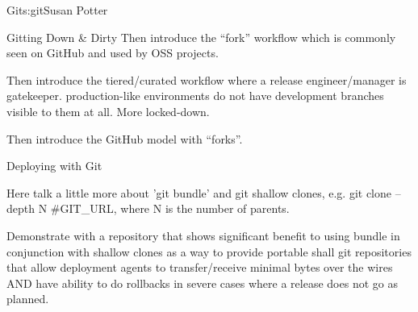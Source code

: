 \begin{aosachapter}{Git}{s:git}{Susan Potter}
\begin{aosasect1}{Gitting Down \& Dirty}
Then introduce the ``fork'' workflow which is commonly seen on GitHub and
used by OSS projects.

Then introduce the tiered/curated workflow where a release engineer/manager
is gatekeeper. production-like environments do not have development branches
visible to them at all. More locked-down.

Then introduce the GitHub model with ``forks''.

\end{aosasect1}

\begin{aosasect1}{Deploying with Git}

Here talk a little more about 'git bundle' and git shallow clones, e.g.
git clone --depth N #{GIT\_URL}, where N is the number of parents.

Demonstrate with a repository that shows significant benefit to using
bundle in conjunction with shallow clones as a way to provide portable
shall git repositories that allow deployment agents to transfer/receive
minimal bytes over the wires AND have ability to do rollbacks in severe
cases where a release does not go as planned.

\end{aosasect1}

\end{aosachapter}
